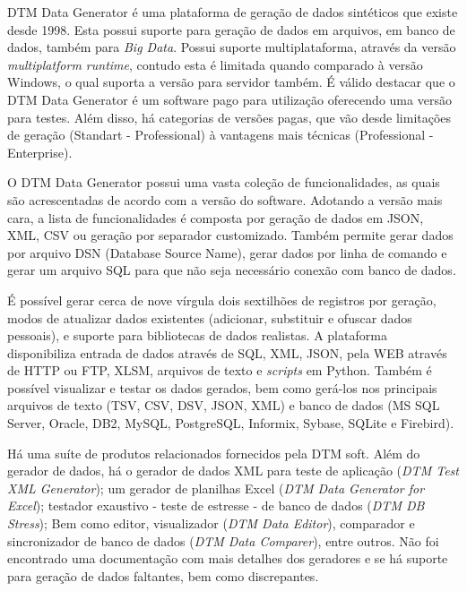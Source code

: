 \documentclass[
	12pt,				%
	openright,			%
	oneside,			%
	a4paper,			%
	english,			%
	brazil				%
	]{abntex2}
\begin{document}
		DTM Data Generator \cite{DTMDataGenerator} é uma plataforma de geração de dados sintéticos que existe desde 1998.
		Esta possui suporte para geração de dados em arquivos, em banco de dados, também para \emph{Big Data}.
		Possui suporte multiplataforma, através da versão \emph{multiplatform runtime}, contudo esta é limitada quando comparado à versão Windows, o qual suporta a versão para servidor também.
		É válido destacar que o DTM Data Generator é um software pago para utilização oferecendo uma versão para testes.
		Além disso, há categorias de versões pagas, que vão desde limitações de geração (Standart - Professional) à vantagens mais técnicas (Professional - Enterprise).
		\\
		\par
		O DTM Data Generator possui uma vasta coleção de funcionalidades, as quais são acrescentadas de acordo com a versão do software.
		Adotando a versão mais cara, a lista de funcionalidades é composta por geração de dados em JSON, XML, CSV ou geração por separador customizado.
		Também permite gerar dados por arquivo DSN (Database Source Name), gerar dados por linha de comando e gerar um arquivo SQL para que não seja necessário conexão com banco de dados.
		\par
		É possível gerar cerca de nove vírgula dois sextilhões de registros por geração, modos de atualizar dados existentes (adicionar, substituir e ofuscar dados pessoais), e suporte para bibliotecas de dados realistas.
		A plataforma disponibiliza entrada de dados através de SQL, XML, JSON, pela WEB através de HTTP ou FTP, XLSM, arquivos de texto e \emph{scripts} em Python.
		Também é possível visualizar e testar os dados gerados, bem como gerá-los nos principais arquivos de texto (TSV, CSV, DSV, JSON, XML) e banco de dados (MS SQL Server, Oracle, DB2, MySQL, PostgreSQL, Informix, Sybase, SQLite e Firebird). 
		\par
		Há uma suíte de produtos relacionados fornecidos pela DTM soft. 
		Além do gerador de dados, 
			há o gerador de dados XML para teste de aplicação (\emph{DTM Test XML Generator});
			um gerador de planilhas Excel (\emph{DTM Data Generator for Excel});
			testador exaustivo - teste de estresse - de banco de dados (\emph{DTM DB Stress});
			Bem como editor, visualizador (\emph{DTM Data Editor}), comparador e sincronizador de banco de dados (\emph{DTM Data Comparer}), entre outros.
		Não foi encontrado uma documentação com mais detalhes dos geradores e se há suporte para geração de dados faltantes, bem como discrepantes.
\end{document}
